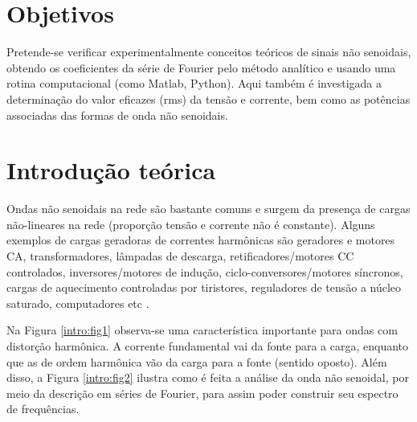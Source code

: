 \documentclass[a4paper,12pt,oneside,openany,table,xcdraw]{article}
\begin{document}
\newcommand{\thedepartment}{Faculdade de Engenharia Elétrica}
\newcommand{\thecourse}{FEELT}
\newcommand{\thetitle}{ANÁLISE DE ONDAS NÃO SENOIDAIS - LÂMPADAS (CARGAS NÃO LINEARES)}
\newcommand{\thetype}{Relatório da Disciplina de Experimental de Circuitos Elétricos II}
\newcommand{\theproftitle}{Bacharel em Engenharia Elétrica}
\newcommand{\thestudent}{Lesly Viviane Montúfar Berrios\\
\centering11811ETE001}
\newcommand{\theadvisor}{Prof. Wellington Maycon Santos Bernardes}
\newcommand{\thecity}{Uberlândia}

\thispagestyle{empty}


\onehalfspacing
\tableofcontents %
\newpage

\section{Objetivos} %
Pretende-se verificar experimentalmente conceitos teóricos de sinais não senoidais, obtendo os coeficientes da série de Fourier pelo método analítico e usando uma rotina computacional (como Matlab, Python). Aqui também é investigada a determinação do valor eficazes (rms) da tensão e corrente, bem como as potências associadas das formas de onda não senoidais.

\section{Introdução teórica} %

Ondas não senoidais na rede são bastante comuns e surgem da presença de cargas não-lineares na rede (proporção tensão e corrente não é constante). Alguns exemplos de cargas geradoras de correntes harmônicas são geradores e motores CA, transformadores, lâmpadas de descarga, retificadores/motores CC controlados, inversores/motores de indução, ciclo-conversores/motores síncronos, cargas de aquecimento controladas por tiristores, reguladores de tensão a núcleo saturado, computadores etc \cite{PH}. 

Na Figura \ref{intro:fig1} observa-se uma característica importante para ondas com distorção harmônica. A corrente fundamental vai da fonte para a carga, enquanto que as de ordem harmônica vão da carga para a fonte (sentido oposto). Além disso, a Figura \ref{intro:fig2} ilustra como é feita a análise da onda não senoidal, por meio da descrição em séries de Fourier, para assim poder construir seu espectro de frequências.
\end{document}

